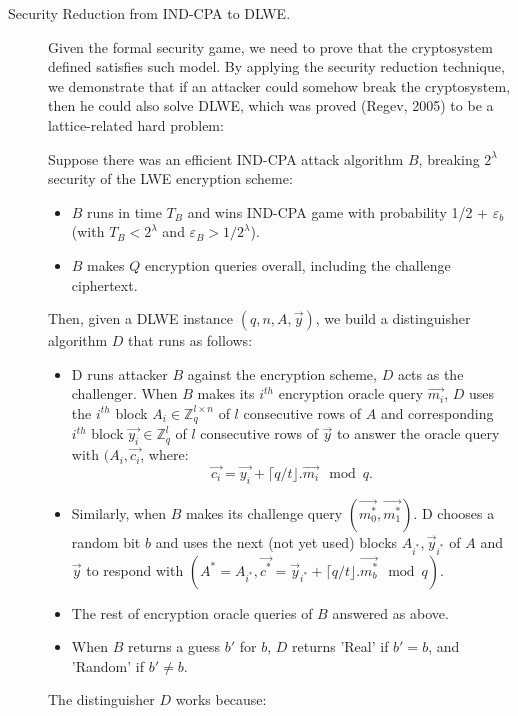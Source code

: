 \begin{description}
\begin{description}
  \item [Security Reduction from IND-CPA to DLWE.] Given the formal security
    game, we need to prove that the cryptosystem defined satisfies such
    model. By applying the security reduction technique, we demonstrate that if
    an attacker could somehow break the cryptosystem, then he could also solve
    DLWE, which was proved (Regev, 2005) to be a lattice-related hard problem:

    Suppose there was an efficient IND-CPA attack algorithm $B$, breaking
    $2^\lambda$ security of the LWE encryption scheme:
    \begin{itemize}
    \item $B$ runs in time $T_B$ and wins IND-CPA game with probability 1/2 +
      $\varepsilon_b$ (with $T_B < 2^\lambda$ and
      $\varepsilon_B > 1/2^\lambda$).
    \item $B$ makes $Q$ encryption queries overall, including the challenge
      ciphertext.
    \end{itemize}
    Then, given a DLWE instance $(q,n,A,\vec{y})$, we build a distinguisher
    algorithm $D$ that runs as follows:
    \begin{itemize}
    \item D runs attacker $B$ against the encryption scheme, $D$ acts as the
      challenger. When $B$ makes its $i^{th}$ encryption oracle query
      $\vec{m_i}$, $D$ uses the $i^{th}$ block
      $A_i \in \mathbb{Z}_q^{l \times n}$ of $l$ consecutive rows of $A$ and
      corresponding $i^{th}$ block $\vec{y_i}\in \mathbb{Z}_q^l$ of $l$
      consecutive rows of $\vec{y}$ to answer the oracle query with
      $(A_i, \vec{c_i}$, where:
      \[
        \vec{c_i} = \vec{y_i} + \lceil q/t \rfloor .  \vec{m_i} \mod q.
      \]
    \item Similarly, when $B$ makes its challenge query
      $(\vec{m_0^*},\vec{m_1^*})$. D chooses a random bit $b$ and uses the next
      (not yet used) blocks $A_{i^*}, \vec{y}_{i^*}$ of $A$ and $\vec{y}$ to
      respond with
      $(A^* = A_{i^*}, \vec{c^*} = \vec{y}_{i^*} + \lceil q/t \rfloor .
      \vec{m_b^*} \mod q)$.
    \item The rest of encryption oracle queries of $B$ answered as above.
    \item When $B$ returns a guess $b'$ for $b$, $D$ returns 'Real' if $b' = b$,
      and 'Random' if $b' \neq b$.
    \end{itemize}
    The distinguisher $D$ works because:
    \begin{itemize}

\end{itemize}
\end{description}
\end{description}
